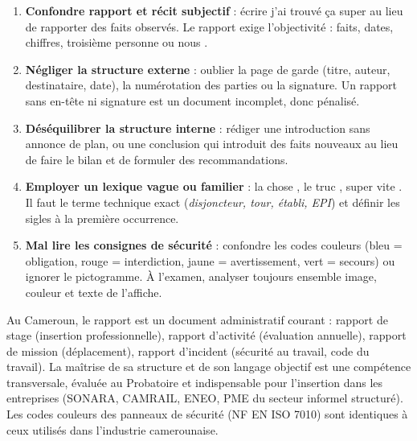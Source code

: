 \documentclass[11pt]{article}
\newcounter{popsec}
\newcounter{popsub}
\newcommand{\courssub}[1]{%
  \stepcounter{popsub}%
  \par\vspace{9pt}\noindent{\popxbold\fontsize{11.5}{13}\selectfont\color{popink}{\color{poporange}\thepopsec.\thepopsub}\hspace{6pt}#1}\par\nopagebreak\vspace{4pt}
}
\begin{document}
\courssub{Synthèse et points de vigilance}

\begin{aretenir}
\begin{enumerate}
\item \textbf{Confondre rapport et récit subjectif} : écrire \og j'ai trouvé ça super \fg{} au lieu de rapporter des faits observés. Le rapport exige l'objectivité : faits, dates, chiffres, troisième personne ou \og nous \fg{}.
\item \textbf{Négliger la structure externe} : oublier la page de garde (titre, auteur, destinataire, date), la numérotation des parties ou la signature. Un rapport sans en-tête ni signature est un document incomplet, donc pénalisé.
\item \textbf{Déséquilibrer la structure interne} : rédiger une introduction sans annonce de plan, ou une conclusion qui introduit des faits nouveaux au lieu de faire le bilan et de formuler des recommandations.
\item \textbf{Employer un lexique vague ou familier} : \og la chose \fg{}, \og le truc \fg{}, \og super vite \fg{}. Il faut le terme technique exact (\emph{disjoncteur, tour, établi, EPI}) et définir les sigles à la première occurrence.
\item \textbf{Mal lire les consignes de sécurité} : confondre les codes couleurs (bleu = obligation, rouge = interdiction, jaune = avertissement, vert = secours) ou ignorer le pictogramme. À l'examen, analyser toujours ensemble image, couleur et texte de l'affiche.
\end{enumerate}
\end{aretenir}

\begin{savaistu}
Au Cameroun, le rapport est un document administratif courant : rapport de stage (insertion professionnelle), rapport d'activité (évaluation annuelle), rapport de mission (déplacement), rapport d'incident (sécurité au travail, code du travail). La maîtrise de sa structure et de son langage objectif est une compétence transversale, évaluée au Probatoire et indispensable pour l'insertion dans les entreprises (SONARA, CAMRAIL, ENEO, PME du secteur informel structuré). Les codes couleurs des panneaux de sécurité (NF EN ISO 7010) sont identiques à ceux utilisés dans l'industrie camerounaise.
\end{savaistu}

\newpage
\end{document}

